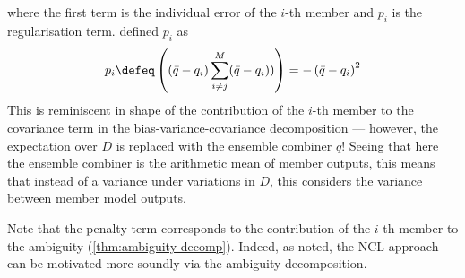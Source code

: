 \documentclass[../main.tex]{subfiles}
\begin{document}
where the first term is the individual error of the $i$-th member and $p_i$ is the regularisation term. \cite{liu_EnsembleLearningNegative_1999} defined $p_i$ as
$$
p_{i} \defeq \left( 
(\bar{q} - q_i)
\sum_{i \not=j}^M (\bar{q} - q_i))
\right)
= - \left(\bar{q} - q_i\right)^2
$$
This is reminiscent in shape of the contribution of the $i$-th member to the covariance term in the bias-variance-covariance decomposition --- however, the expectation over $D$ is replaced with the ensemble combiner $\bar{q}$! Seeing that here the ensemble combiner is the arithmetic mean of member outputs, this means that instead of a variance under variations in $D$, this considers the variance between member model outputs. 

Note that the penalty term corresponds to the contribution of the $i$-th member to the ambiguity (\ref{thm:ambiguity-decomp}).
Indeed, as \cite{brown_ManagingDiversityRegression_2005} noted, the NCL approach can be motivated more soundly via the ambiguity decomposition. 
\end{document}
